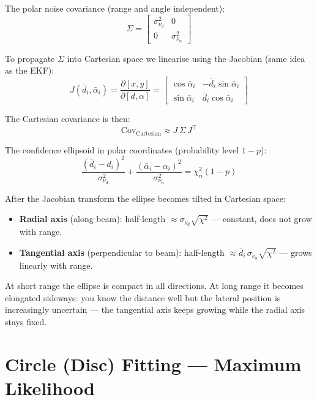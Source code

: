 \documentclass[12pt, a4paper]{article}
\begin{document}
The polar noise covariance (range and angle independent):
\[
  \Sigma = \begin{bmatrix} \sigma_{\nu_d}^2 & 0 \\ 0 & \sigma_{\nu_\alpha}^2 \end{bmatrix}
\]

To propagate $\Sigma$ into Cartesian space we linearise using the Jacobian
(same idea as the EKF):
\[
  J(\bar{d}_i, \bar{\alpha}_i) =
  \frac{\partial[x,y]}{\partial[d,\alpha]}
  =
  \begin{bmatrix}
    \cos\bar{\alpha}_i & -\bar{d}_i\sin\bar{\alpha}_i \\
    \sin\bar{\alpha}_i &  \bar{d}_i\cos\bar{\alpha}_i
  \end{bmatrix}
\]

The Cartesian covariance is then:
\[
  \text{Cov}_{\text{Cartesian}} \approx J\,\Sigma\,J^\top
\]

The confidence ellipsoid in polar coordinates (probability level $1-p$):
\[
  \frac{(\bar{d}_i - d_i)^2}{\sigma_{\nu_d}^2}
  + \frac{(\bar{\alpha}_i - \alpha_i)^2}{\sigma_{\nu_\alpha}^2}
  = \chi^2_n(1-p)
\]

After the Jacobian transform the ellipse becomes tilted in Cartesian space:
\begin{itemize}[leftmargin=1.4em]
  \item \textbf{Radial axis} (along beam): half-length $\approx \sigma_{\nu_d}\sqrt{\chi^2}$
        --- constant, does not grow with range.
  \item \textbf{Tangential axis} (perpendicular to beam): half-length
        $\approx \bar{d}_i\,\sigma_{\nu_\alpha}\sqrt{\chi^2}$
        --- grows linearly with range.
\end{itemize}

\begin{notebox}
  At short range the ellipse is compact in all directions.
  At long range it becomes elongated sideways: you know the distance well
  but the lateral position is increasingly uncertain --- the tangential axis
  keeps growing while the radial axis stays fixed.
\end{notebox}

\section*{Circle (Disc) Fitting --- Maximum Likelihood}
\end{document}
